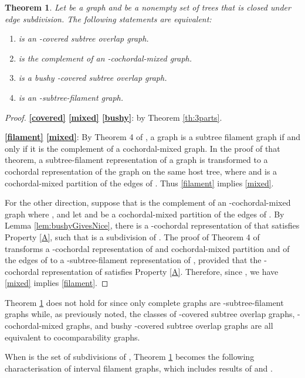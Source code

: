\documentclass[
final
]{dmtcs-episciences}        \usepackage{graphics, amsthm, amsmath, amssymb, algorithm, algorithmic}
\newtheorem{theorem}{Theorem}
\begin{document}
\begin{theorem}\label{bigThm}
Let  be a graph and  be a nonempty set of trees that is closed under edge subdivision. The following statements are equivalent:
\begin{enumerate}
\item  is an -covered subtree overlap graph. \label{covered}
\item  is the complement of an -cochordal-mixed graph. \label{mixed}
\item  is a bushy -covered subtree overlap graph. \label{bushy}
\item  is an -subtree-filament graph. \label{filament}
\end{enumerate}
\end{theorem}
\begin{proof}

\textbf{\ref{covered}  \ref{mixed}  \ref{bushy}}: by Theorem \ref{th:3parts}.

\textbf{\ref{filament}  \ref{mixed}}: 
By Theorem 4 of \cite{gavril2000}, a graph is a subtree filament graph if and only if it is the complement of a cochordal-mixed graph. 
In the proof of that theorem, a subtree-filament representation of a graph  is transformed to a cochordal representation of the graph  on the same host tree, where  and  is a cochordal-mixed partition of the edges of . Thus \ref{filament} implies \ref{mixed}. 

For the other direction, suppose that  is the complement of an -cochordal-mixed graph where , and let  and  be a cochordal-mixed partition of the edges of . By Lemma \ref{lem:bushyGivesNice}, there is a -cochordal representation of  that satisfies Property \ref{A}, such that  is a subdivision of . The proof of Theorem 4 of \cite{gavril2000} transforms a -cochordal representation of  and cochordal-mixed partition  and  of the edges of  to a -subtree-filament representation of , provided that the 
-cochordal representation of  satisfies Property \ref{A}.
Therefore, since , we have \ref{mixed} implies \ref{filament}.
\end{proof}

Theorem \ref{bigThm} does not hold for  since only complete graphs are 
-subtree-filament graphs while, as previously noted, 
the classes of -covered subtree overlap graphs, 
-cochordal-mixed graphs, and
bushy -covered subtree overlap graphs
are all equivalent to cocomparability graphs.


When  is the set of subdivisions of , Theorem \ref{bigThm} becomes the following characterisation of interval filament graphs, which includes results of \cite{CGO} and \cite{gavril2000}.
\end{document}
